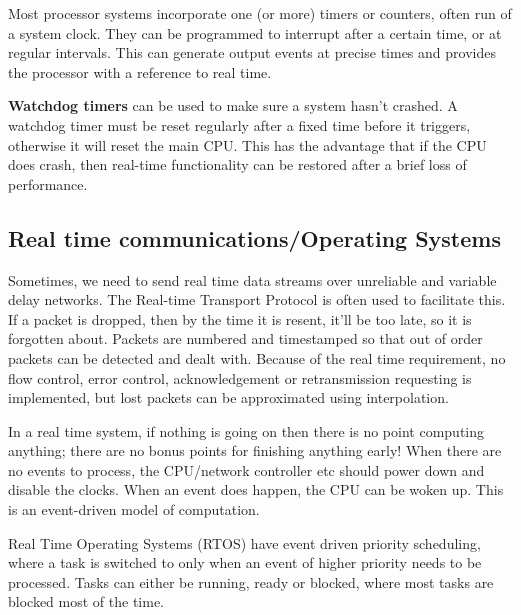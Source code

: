 
Most processor systems incorporate one (or more) timers or counters, often run
of a system clock. They can be programmed to interrupt after a certain time, or
at regular intervals. This can generate output events at precise times and
provides the processor with a reference to real time.

\textbf{Watchdog timers} can be used to make sure a system hasn't crashed. A
watchdog timer must be reset regularly after a fixed time before it triggers,
otherwise it will reset the main CPU. This has the advantage that if the CPU
does crash, then real-time functionality can be restored after a brief loss of
performance.

\subsection{Real time communications/Operating Systems}

Sometimes, we need to send real time data streams over unreliable and variable
delay networks. The Real-time Transport Protocol is often used to facilitate
this. If a packet is dropped, then by the time it is resent, it'll be too late,
so it is forgotten about. Packets are numbered and timestamped so that out of
order packets can be detected and dealt with. Because of the real time
requirement, no flow control, error control, acknowledgement or retransmission
requesting is implemented, but lost packets can be approximated using
interpolation. 

In a real time system, if nothing is going on then there is no point computing
anything; there are no bonus points for finishing anything early! When there are
no events to process, the CPU/network controller etc should power down and
disable the clocks. When an event does happen, the CPU can be woken up. This is
an event-driven model of computation.

Real Time Operating Systems (RTOS) have event driven priority scheduling, where
a task is switched to only when an event of higher priority needs to be
processed. Tasks can either be running, ready or blocked, where most tasks are
blocked most of the time.

